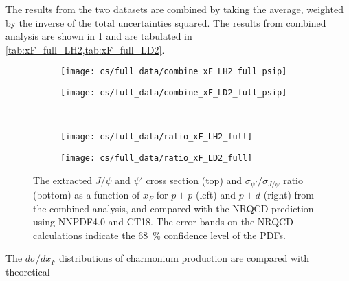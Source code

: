 \documentclass[../main.tex]{subfiles}
\begin{document}
The results from the two datasets are combined by taking the average, weighted by
the inverse of the total uncertainties squared.
The results from combined analysis are shown in \cref{fig:cs_xF_full} and are tabulated in
\cref{tab:xF_full_LH2,tab:xF_full_LD2}.
\begin{figure}
	\centering
	\begin{subfigure}{0.48\linewidth}
		\texttt{[image: cs/full\_data/combine\_xF\_LH2\_full\_psip]}
	\end{subfigure}
	\begin{subfigure}{0.48\linewidth}
		\texttt{[image: cs/full\_data/combine\_xF\_LD2\_full\_psip]}
	\end{subfigure}\\
	\begin{subfigure}{0.48\linewidth}
		\texttt{[image: cs/full\_data/ratio\_xF\_LH2\_full]}
	\end{subfigure}
	\begin{subfigure}{0.48\linewidth}
		\texttt{[image: cs/full\_data/ratio\_xF\_LD2\_full]}
	\end{subfigure}
	\caption{The extracted $J/\psi$ and $\psi'$ cross section (top) and $\sigma_{\psi'}/\sigma_{J/\psi}$
		ratio (bottom) as a function of $x_F$ for $p+p$ (left) and $p+d$ (right) from
		the combined analysis, and compared with the NRQCD prediction using NNPDF4.0 and CT18.
		The error bands on the NRQCD calculations indicate the \SI{68}{\percent} confidence level of the PDFs.}
	\label{fig:cs_xF_full}
\end{figure}
\begin{table}[h!]
	\centering
	\caption{Cross section as a function of $x_F$ (in \unit{\nano\barn\per nucleon}) and the
		$\sigma_{\psi'}/\sigma_{J/\psi}$ ratio for $p+p$ extracted from the combined analysis, with
		their statistical and systematic uncertainties and the average $x_F$ in each bin.}
	
	\label{tab:xF_full_LH2}
\end{table}
\begin{table}[h!]
	\centering
	\caption{Cross section as a function of $x_F$ (in \unit{\nano\barn\per nucleon}) and the
		$\sigma_{\psi'}/\sigma_{J/\psi}$ ratio for $p+d$ extracted from the combined analysis, with
		their statistical and systematic uncertainties and the average $x_F$ in each bin.}
	
	\label{tab:xF_full_LD2}
\end{table}
The $d\sigma/dx_F$ distributions of charmonium production are compared with theoretical
\end{document}
